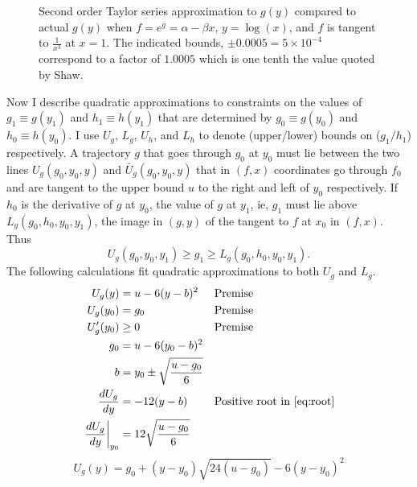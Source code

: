 \documentclass[twocolumn]{article}
\begin{document}
\begin{figure}
  \centering
    \caption{Second order Taylor series approximation to $g(y)$
      compared to actual $g(y)$ when $f = e^g = \alpha - \beta x$,
      $y=\log(x)$, and $f$ is tangent to $\frac{1}{x^3}$ at $x=1$.
      The indicated bounds, $\pm 0.0005 = 5\times10^{-4}$ correspond
      to a factor of $1.0005$ which is one tenth the value quoted by
      Shaw.}
  \label{fig:taylor}
\end{figure}
Now I describe quadratic approximations to constraints on the values
of $g_1 \equiv g(y_1)$ and $h_1 \equiv h(y_1)$ that are determined by
$g_0 \equiv g(y_0)$ and $h_0 \equiv h(y_0)$.  I use $U_g$, $L_g$,
$U_h$, and $L_h$ to denote (upper/lower) bounds on ($g_1/h_1$)
respectively.  A trajectory $g$ that goes through $g_0$ at $y_0$ must
lie between the two lines $U_g(g_0,y_0,y)$ and $\bar U_g(g_0,y_0,y)$
that in $(f,x)$ coordinates go through $f_0$ and are tangent to the
upper bound $u$ to the right and left of $y_0$ respectively.  If $h_0$
is the derivative of $g$ at $y_0$, the value of $g$ at $y_1$, ie,
$g_1$ must lie above $L_g(g_0,h_0,y_0, y_1)$, the image in $(g,y)$ of
the tangent to $f$ at $x_0$ in $(f,x)$.  Thus
\begin{equation}
  \label{eq:boundsA}
  U_g(g_0,y_0, y_1) \geq g_1 \geq L_g(g_0,h_0,y_0, y_1).
\end{equation}
The following calculations fit quadratic approximations to both $U_g$
and $L_g$.
\newcommand{\Rad}[1]{\sqrt{24\left(u#1\right)}}
\newcommand{\UgQ}{ g_0 + \Delta_y\Rad{-g_0} - 6 \Delta_y^2}
\begin{align}
  U_g(y) &= u - 6(y-b)^2 &&\text{Premise} \nonumber \\
  U_g(y_0) &= g_0 &&\text{Premise} \nonumber \\
  \label{eq:premise}
  U'_g(y_0) &\geq 0 &&\text{Premise} \\
  g_0 &= u - 6(y_0-b)^2 \nonumber \\
  \label{eq:root}
  b &= y_0 \pm \sqrt{\frac{u-g_0}{6}} \\
  \label{eq:dugb}
  \frac{d U_g}{d y} &= -12(y-b) && \text{Positive root in \eqref{eq:root}} \\
  \label{eq:dug}
  \left. \frac{d U_g}{d y} \right|_{y_0} &= 12\sqrt{\frac{u-g_0}{6}}
\end{align}
\begin{equation*}
  U_g(y) = g_0 + (y-y_0)\Rad{-g_0} - 6 (y-y_0)^2
\end{equation*}
\end{document}
